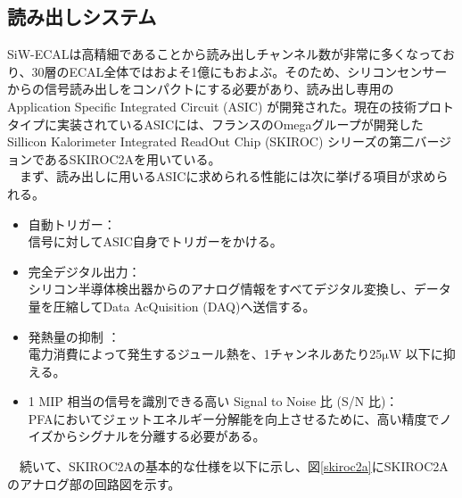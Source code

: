 \subsection{読み出しシステム}
 SiW-ECALは高精細であることから読み出しチャンネル数が非常に多くなっており、30層のECAL全体ではおよそ1億にもおよぶ。そのため、シリコンセンサーからの信号読み出しをコンパクトにする必要があり、読み出し専用のApplication Specific Integrated Circuit (ASIC) が開発された。現在の技術プロトタイプに実装されているASICには、フランスのOmegaグループが開発した Sillicon Kalorimeter Integrated ReadOut Chip (SKIROC) シリーズの第二バージョンであるSKIROC2Aを用いている。\\
　まず、読み出しに用いるASICに求められる性能には次に挙げる項目が求められる。
 \begin{itemize}
	\item 自動トリガー：\\
		信号に対してASIC自身でトリガーをかける。
	\item 完全デジタル出力：\\
		 シリコン半導体検出器からのアナログ情報をすべてデジタル変換し、データ量を圧縮してData AcQuisition (DAQ)へ送信する。
	\item 発熱量の抑制 ：\\
		電力消費によって発生するジュール熱を、1チャンネルあたり25$\mathrm{\mu W}$ 以下に抑える。
	\item 1 MIP 相当の信号を識別できる高い Signal to Noise 比 (S/N 比)：\\
		PFAにおいてジェットエネルギー分解能を向上させるために、高い精度でノイズからシグナルを分離する必要がある。
 \end{itemize}
　続いて、SKIROC2Aの基本的な仕様を以下に示し、図\ref{skiroc2a}にSKIROC2Aのアナログ部の回路図を示す。

